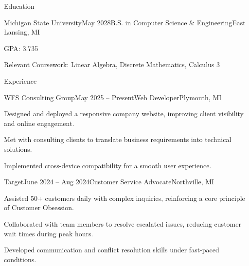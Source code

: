 \documentclass[
	11pt
]{resume}
\begin{document}
	\begin{rSection}{Education}
		\begin{rSectionEntry}{Michigan State University}{May 2028}{B.S. in Computer Science \& Engineering}{East Lansing, MI}
			\item GPA: 3.735
			\item Relevant Coursework: Linear Algebra, Discrete Mathematics, Calculus 3
		\end{rSectionEntry}
	\end{rSection}

	\begin{rSection}{Experience}
		\begin{rSectionEntry}{WFS Consulting Group}{May 2025 -- Present}{Web Developer}{Plymouth, MI}
			\item Designed and deployed a responsive company website, improving client visibility and online engagement.
			\item Met with consulting clients to translate business requirements into technical solutions.
			\item Implemented cross-device compatibility for a smooth user experience.
		\end{rSectionEntry}

		\begin{rSectionEntry}{Target}{June 2024 -- Aug 2024}{Customer Service Advocate}{Northville, MI}
			\item Assisted 50+ customers daily with complex inquiries, reinforcing a core principle of Customer Obsession.
			\item Collaborated with team members to resolve escalated issues, reducing customer wait times during peak hours.
			\item Developed communication and conflict resolution skills under fast-paced conditions.
		\end{rSectionEntry}
	\end{rSection}
\end{document}
